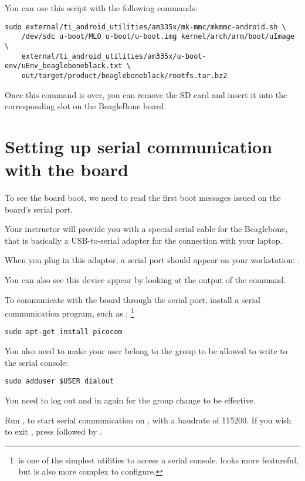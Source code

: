 You can use this script with the following commands:

\begin{verbatim}
sudo external/ti_android_utilities/am335x/mk-mmc/mkmmc-android.sh \
    /dev/sdc u-boot/MLO u-boot/u-boot.img kernel/arch/arm/boot/uImage \
    external/ti_android_utilities/am335x/u-boot-env/uEnv_beagleboneblack.txt \
    out/target/product/beagleboneblack/rootfs.tar.bz2
\end{verbatim}

Once this command is over, you can remove the SD card and insert it
into the corresponding slot on the BeagleBone board.

\section{Setting up serial communication with the board}

To see the board boot, we need to read the first boot messages issued
on the board's serial port.

Your instructor will provide you with a special serial cable for the
Beaglebone, that is basically a USB-to-serial adapter for the
connection with your laptop.

When you plug in this adaptor, a serial port should appear on your
workstation: .

You can also see this device appear by looking at the output of the
\code{dmesg} command.

To communicate with the board through the serial port, install a
serial communication program, such as :
\footnote{ is one of the simplest utilities to access a
  serial console. \code{minicom} looks more featureful, but is also
  more complex to configure.}

\begin{verbatim}
sudo apt-get install picocom
\end{verbatim}

You also need to make your user belong to the  group to be
allowed to write to the serial console:

\begin{verbatim}
sudo adduser $USER dialout
\end{verbatim}

You need to log out and in again for the group change to be effective.

Run , to start serial
communication on \code{/dev/ttyUSB0}, with a baudrate of 115200. If
you wish to exit , press \code{[Ctrl][a]} followed by
\code{[Ctrl][x]}.

